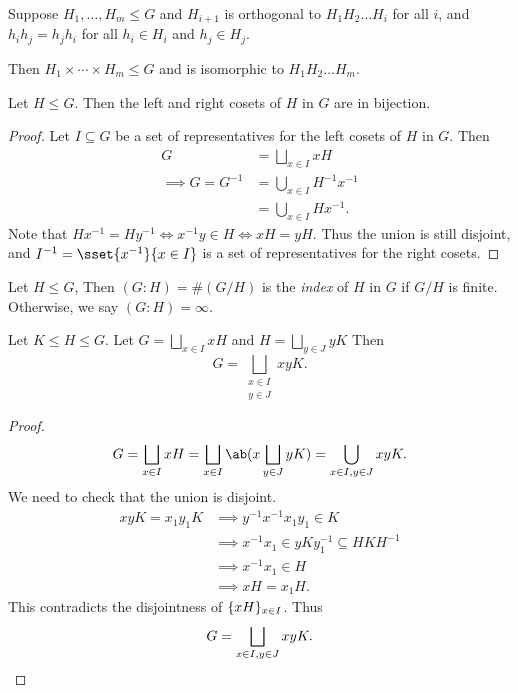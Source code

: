 \begin{remark}
    Suppose $H_1, \dots, H_m \le G$
    and $H_{i+1}$ is orthogonal to $H_1 H_2 \dots H_i$ for all $i$,
    and $h_i h_j = h_j h_i$ for all $h_i \in H_i$ and $h_j \in H_j$.

    Then $H_1 \times \cdots \times H_m \le G$ and is isomorphic to
    $H_1 H_2 \dots H_m$.
\end{remark}

\begin{lemma*} \label{thm:left-right}
    Let $H \le G$.
    Then the left and right cosets of $H$ in $G$ are in bijection.
\end{lemma*}
\begin{proof}
    Let $I \subseteq G$ be a set of representatives for the left cosets of
    $H$ in $G$.
    Then \begin{align*}
        G &= \bigsqcup_{x \in I} x H \\
        \implies G = G^{-1} &= \bigcup_{x \in I} H^{-1} x^{-1} \\
        &= \bigcup_{x \in I} H x^{-1}.
    \end{align*}
    Note that $H x^{-1} = H y^{-1} \iff x^{-1} y \in H \iff xH = yH$.
    Thus the union is still disjoint, and
    $I^{-1} = \sset{x^{-1}}{x \in I}$ is a set of
    representatives for the right cosets.
\end{proof}
\begin{definition*}[index] \label{def:index}
    Let $H \le G$,
    Then $(G : H) = \#(G / H)$ is the \emph{index} of $H$ in $G$
    if $G/H$ is finite.
    Otherwise, we say $(G : H) = \infty$.
\end{definition*}

\begin{proposition}
    Let $K \le H \le G$.
    Let $G = \bigsqcup\limits_{x \in I} xH$ and
    $H = \bigsqcup\limits_{y \in J} yK$
    Then \[
        G = \bigsqcup_{\substack{x \in I \\ y \in J}} xyK.
    \]
\end{proposition}
\begin{proof}
    \[
        G = \bigsqcup_{x \in I} xH
        = \bigsqcup_{x \in I} \ab(x \bigsqcup_{y \in J} yK)
        = \bigcup_{x \in I, y \in J} xyK.
    \] We need to check that the union is disjoint.
    \begin{align*}
        xyK = x_1y_1K &\implies y^{-1}x^{-1}x_1y_1 \in K \\
            &\implies x^{-1}x_1 \in yK y_1^{-1} \subseteq HKH^{-1} \\
            &\implies x^{-1}x_1 \in H \\
            &\implies xH = x_1H.
    \end{align*}
    This contradicts the disjointness of $\{xH\}_{x \in I}$.
    Thus \[
        G = \bigsqcup_{x \in I, y \in J} xyK. \qedhere
    \]
\end{proof}


